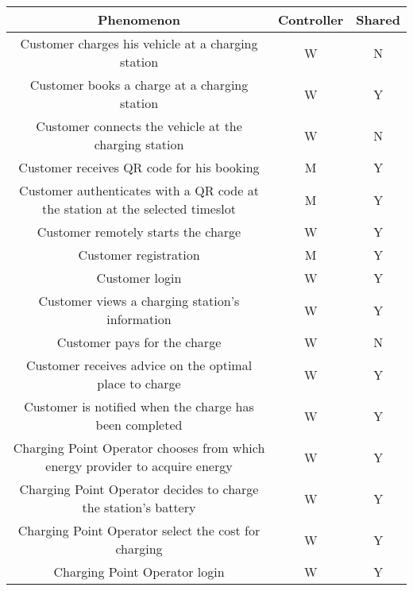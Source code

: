 \begin{table}[!h]
        \hspace{-66px}
        \begin{tabular}{|c|c|c|}
        \hline
        \textbf{Phenomenon}                                        & \textbf{Controller} & \textbf{Shared} \\ \hline
        Customer charges his vehicle at a charging station  & W          & N      \\ \hline
        Customer books a charge at a charging station         & W          & Y      \\ \hline
        Customer connects the vehicle at the charging station              & W          & N      \\ \hline
        Customer receives QR code for his booking      & M          & Y      \\ \hline
        Customer authenticates with a QR code at the station at the selected timeslot      & M          & Y      \\ \hline
        Customer remotely starts the charge                   & W          & Y      \\ \hline       
        Customer registration                                 & M          & Y      \\ \hline
        Customer login                                        & W          & Y      \\ \hline
        Customer views a charging station's information       & W          & Y      \\ \hline
        Customer pays for the charge                          & W          & N      \\ \hline
        Customer receives advice on the optimal place to charge            & W          & Y      \\ \hline
        Customer is notified when the charge has been completed   & W          & Y      \\ \hline
        Charging Point Operator chooses from which energy provider to acquire energy   & W          & Y      \\ \hline
        Charging Point Operator decides to charge the station's battery    & W          & Y      \\ \hline
        Charging Point Operator select the cost for charging &W          & Y      \\ \hline
        Charging Point Operator login &W          & Y      \\ \hline
       \end{tabular}
        
\end{table}


